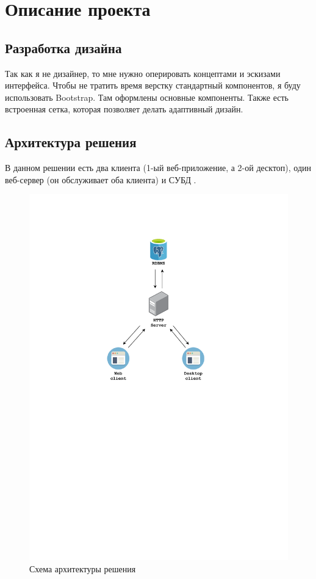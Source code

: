 \section{Описание проекта}
\subsection{Разработка дизайна}
Так как я не дизайнер, то мне нужно оперировать концептами и эскизами интерфейса. Чтобы не тратить время верстку стандартный компонентов, я буду использовать Bootstrap. Там оформлены основные компоненты. Также есть встроенная сетка, которая позволяет делать адаптивный дизайн.

\subsection{Архитектура решения}
В данном решении есть два клиента (1-ый веб-приложение, а 2-ой десктоп), один веб-сервер (он обслуживает оба клиента) и СУБД \textcite{postgres}.

\begin{figure}[H]
    \begin{center}
        \includegraphics[trim=100 400 100 100,clip,scale=0.7]{images/app_scheme.pdf}
    \end{center}
    \caption{Схема архитектуры решения}
\end{figure}

